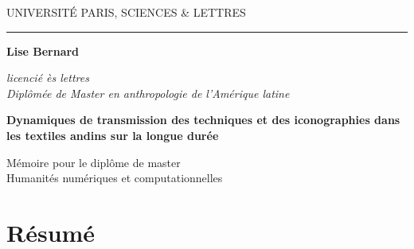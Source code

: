 \documentclass[a4paper, twoside]{book}
\begin{document}
\frontmatter

\begin{titlepage}
\begin{center}

\bigskip

\begin{large}
UNIVERSITÉ PARIS, SCIENCES \& LETTRES
\end{large}
\begin{center}\rule{2cm}{0.02cm}\end{center}

\bigskip
\bigskip
\bigskip

\begin{Large}
\textbf{Lise Bernard}\\
\end{Large}
\begin{normalsize} \textit{licencié ès lettres}\\
\textit{Diplômée de Master en anthropologie de l'Amérique latine}\\
\end{normalsize}

\bigskip
\bigskip
\bigskip

\begin{Huge}
\textbf{Dynamiques de transmission des techniques et des iconographies dans les textiles andins sur la longue durée}\\
\end{Huge}
\bigskip
\bigskip
\bigskip

\bigskip
\bigskip
\bigskip
\begin{large}
\end{large}
\vfill

\begin{large}
Mémoire 
pour le diplôme de master \\
\og Humanités numériques et computationnelles \fg{} \\
\end{large}

\end{center}
\end{titlepage}

\thispagestyle{empty}

\cleardoublepage

\section*{Résumé}

\vspace{5pt}
\end{document}
